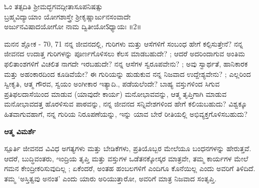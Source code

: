\begin{center}
{\color{brown}
ಓಂ ತತ್ಸದಿತಿ ಶ್ರೀಮದ್ಭಗವದ್ಗೀತಾಸೂಪನಿಷತ್ಸು \\
ಬ್ರಹ್ಮವಿದ್ಯಾಯಾಂ ಯೋಗಶಾಸ್ತ್ರೇ ಶ್ರೀಕೃಷ್ಣಾರ್ಜುನಸಂವಾದೇ\\
ಅರ್ಜುನವಿಷಾದಯೋಗೋ ನಾಮ ದ್ವಿತೀಯೋऽಧ್ಯಾಯಃ ॥2॥\\}
\end{center}

\newpage
\begin{mananam}{\mananamfont ಮನನ ಶ್ಲೋಕ - \textenglish{70, 71}}
\footnotesize \mananamtext ನನ್ನ ಜೀವನದಲ್ಲಿ, ಗುರಿಗಳು ಮತ್ತು ಆಸೆಗಳಿಗೆ ಸಂಬಂಧ ಹೇಗೆ ಕಲ್ಪಿಸುತ್ತೇನೆ? ನನ್ನ ಜೀವನದ ಉದಾತ್ತ   ಗುರಿಗಳನ್ನು ಪೂರ್ಣಗೊಳಿಸಲು ಕೆಲಸ ಮಾಡಬಹುದೇ? ; ಆದರೆ ಅದರಿಂದಾಗುವ ಅಂತಿಮ ಫಲಿತಾಂಶಗಳಿಗೆ ವಿಚಲಿತ ನಾಗದೇ ಇರಬಹುದೇ? ನನ್ನ ಆಸೆಗಳ ಸ್ವರೂಪವೇನು? ; ಅವು ಸ್ವಾರ್ಥತೆ, ಹಾನಿಕಾರಕ ಮತ್ತು ಅಹಂಕಾರದಿಂದ ಕೂಡಿವೆಯೇ? ಈ ಗುರಿಯನ್ನು ಹುಡುಕುವ ನನ್ನ ನಿಜವಾದ ಉದ್ದೇಶ್ಯವೇನು? ; ಎಲ್ಲರಿಂದ ಸ್ವೀಕೃತಿ, ಆತ್ಮ ಗೌರವ, ಸ್ವಯಂ  ಅಂಗೀಕಾರ ಇತ್ಯಾದಿ., ಪಡೆಯಲೆಂದೇ?  ಬಾಹ್ಯ ವಸ್ತುಗಳಿಂದ ಸಿಗುವ ಪ್ರತಿಫಲದಾಸೆಯಿಂದ ಮಾಡುವ (ಯಾವುದೇ ಕಾರ್ಯ) ಮನೋಭಾವವನ್ನು, ಆತ್ಮ ತೃಪ್ತಿಗಾಗಿ ಮಾಡುವ ಮನೋಭಾವದತ್ತ ಹೊರಳಿಸುವ ಪಾಠವನ್ನು, ನನ್ನ ಜೀವನದ ಸನ್ನಿವೇಶಗಳಿಂದ ಹೇಗೆ ಕಲಿಯಬಹುದು? ವಿಶ್ವಕ್ಕೂ ಹಿತವಾಗುವಹಾಗೆ, ನನ್ನ ಗುರಿಯ ನಿರೂಪಣೆಯನ್ನು, ಇನ್ನು ಯಾವ ಬೇರೆ ರೀತಿಯಲ್ಲಿ  ಅಭಿವ್ಯಕ್ತಗೊಳಿಸಬಹುದು? 
\end{mananam}
\WritingHand\enspace\textbf{ಆತ್ಮ ವಿಮರ್ಶೆ}
\begin{inspiration}{\mananamfont ಸ್ಪೂರ್ತಿ}
\footnotesize \mananamtext ಜೀವನದ ವಿವಿಧ ಅಗತ್ಯಗಳು ಮತ್ತು ಬೇಡಿಕೆಗಳು, ಪ್ರತಿಯೊಬ್ಬರ ಮೇಲೆಯೂ ಬಂಧನಗಳನ್ನು ಹೇರುತ್ತವೆ. ಆದರೆ, ಬುದ್ಧಿವಂತರು, ಇಂದ್ರಿಯ ತೃಪ್ತಿ ಮತ್ತು ವಸ್ತುಗಳ ಒಡೆತನಕ್ಕೋಸ್ಕರ  ಮಾತ್ರವೇ, ತಮ್ಮ ಕಾರ್ಯಗಳ ಮೇಲೆ ಗಮನ ಕೇಂದ್ರೀಕರಿಸುವುದಿಲ್ಲ ; ಏಕೆಂದರೆ,  ಅಂತಹ ಹಂಬಲಗಳಿಗೆ ಎಂದಿಗೂ ಕೊನೆಯಿಲ್ಲ ಎಂದು ಅವರಿಗೆ ತಿಳಿದಿದೆ.
 ತಮ್ಮ ‘ಅಸ್ತಿತ್ವವು ಅನಂತ’ ಎಂದು ಯಾರು ಅರಿಯುತ್ತಾರೋ, ಅವರಿಗೆ ಮಾತ್ರ ನಿಜವಾದ ಸಂತೃಪ್ತಿ.
\end{inspiration}


